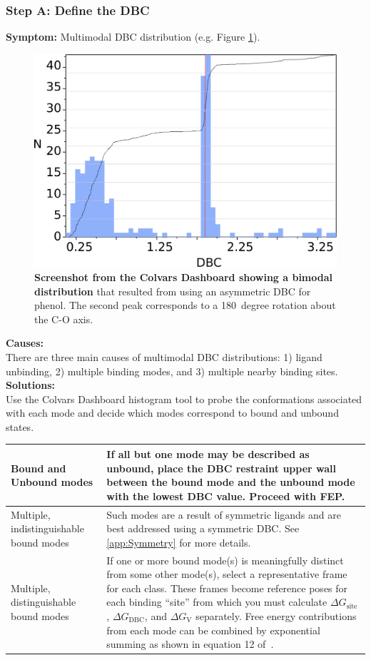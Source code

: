 \documentclass[9pt,tutorial,pubversion]{Styling/livecoms}
\begin{document}
\subsubsection{Step A: Define the DBC}
\noindent\textbf{Symptom:}  Multimodal DBC distribution (e.g. Figure \ref{fig:bimodalDBC}).\\
\begin{figure}[!htb]
    \centering
    \includegraphics[width=0.9\linewidth]{Figures/recropped_bimodal.png}
    \caption{\textbf{Screenshot from the Colvars Dashboard showing a bimodal distribution} that resulted from using an asymmetric DBC for phenol. The second peak corresponds to a 180~degree rotation about the C-O axis.}
    \label{fig:bimodalDBC}
\end{figure}
\noindent\textbf{Causes:}\\
There are three main causes of multimodal DBC distributions: 1) ligand unbinding, 2) multiple binding modes, and 3) multiple nearby binding sites.\\ 
\textbf{Solutions:}\\
Use the Colvars Dashboard histogram tool to probe the conformations associated with each mode and decide which modes correspond to bound and unbound states. \\
\begin{tabular}{|p{3cm}|p{5cm}|}
    \hline
    \center Bound and Unbound modes & If all but one mode may be described as unbound, place the DBC restraint upper wall between the bound mode and the unbound mode with the lowest DBC value. Proceed with FEP. \\\hline
    \center Multiple, indistinguishable bound modes & Such modes are a result of symmetric ligands and are best addressed using a symmetric DBC. See \ref{app:Symmetry} for more details.\\\hline
    \center Multiple, distinguishable bound modes & If one or more bound mode(s) is meaningfully distinct from some other mode(s), select a representative frame for each class. These frames become reference poses for each binding ``site'' from which you must calculate $\Delta G_\mathrm{site}$, $\Delta G_\mathrm{DBC}$, and $\Delta G_\mathrm{V}$ separately. Free energy contributions from each mode can be combined by exponential summing as shown in equation 12 of~\cite{Mobley2006}. \\\hline
\end{tabular}
\end{document}
